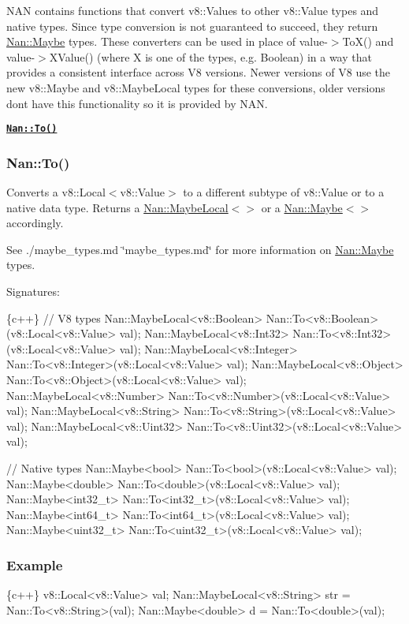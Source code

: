 N\+AN contains functions that convert {\ttfamily v8\+::\+Value}s to other {\ttfamily v8\+::\+Value} types and native types. Since type conversion is not guaranteed to succeed, they return {\ttfamily \hyperlink{class_nan_1_1_maybe}{Nan\+::\+Maybe}} types. These converters can be used in place of {\ttfamily value-\/$>$To\+X()} and {\ttfamily value-\/$>$X\+Value()} (where {\ttfamily X} is one of the types, e.\+g. {\ttfamily Boolean}) in a way that provides a consistent interface across V8 versions. Newer versions of V8 use the new {\ttfamily v8\+::\+Maybe} and {\ttfamily v8\+::\+Maybe\+Local} types for these conversions, older versions don\textquotesingle{}t have this functionality so it is provided by N\+AN.


\begin{DoxyItemize}
\item \href{#api_nan_to}{\tt {\bfseries {\ttfamily Nan\+::\+To()}}}
\end{DoxyItemize}

\label{_api_nan_to}%
 \subsubsection*{Nan\+::\+To()}

Converts a {\ttfamily v8\+::\+Local$<$v8\+::\+Value$>$} to a different subtype of {\ttfamily v8\+::\+Value} or to a native data type. Returns a {\ttfamily \hyperlink{class_nan_1_1_maybe_local}{Nan\+::\+Maybe\+Local}$<$$>$} or a {\ttfamily \hyperlink{class_nan_1_1_maybe}{Nan\+::\+Maybe}$<$$>$} accordingly.

See ./maybe\+\_\+types.md \char`\"{}maybe\+\_\+types.\+md\char`\"{} for more information on {\ttfamily \hyperlink{class_nan_1_1_maybe}{Nan\+::\+Maybe}} types.

Signatures\+:


\begin{DoxyCode}
\{c++\}
// V8 types
Nan::MaybeLocal<v8::Boolean> Nan::To<v8::Boolean>(v8::Local<v8::Value> val);
Nan::MaybeLocal<v8::Int32> Nan::To<v8::Int32>(v8::Local<v8::Value> val);
Nan::MaybeLocal<v8::Integer> Nan::To<v8::Integer>(v8::Local<v8::Value> val);
Nan::MaybeLocal<v8::Object> Nan::To<v8::Object>(v8::Local<v8::Value> val);
Nan::MaybeLocal<v8::Number> Nan::To<v8::Number>(v8::Local<v8::Value> val);
Nan::MaybeLocal<v8::String> Nan::To<v8::String>(v8::Local<v8::Value> val);
Nan::MaybeLocal<v8::Uint32> Nan::To<v8::Uint32>(v8::Local<v8::Value> val);

// Native types
Nan::Maybe<bool> Nan::To<bool>(v8::Local<v8::Value> val);
Nan::Maybe<double> Nan::To<double>(v8::Local<v8::Value> val);
Nan::Maybe<int32\_t> Nan::To<int32\_t>(v8::Local<v8::Value> val);
Nan::Maybe<int64\_t> Nan::To<int64\_t>(v8::Local<v8::Value> val);
Nan::Maybe<uint32\_t> Nan::To<uint32\_t>(v8::Local<v8::Value> val);
\end{DoxyCode}


\subsubsection*{Example}


\begin{DoxyCode}
\{c++\}
v8::Local<v8::Value> val;
Nan::MaybeLocal<v8::String> str = Nan::To<v8::String>(val);
Nan::Maybe<double> d = Nan::To<double>(val);
\end{DoxyCode}
 